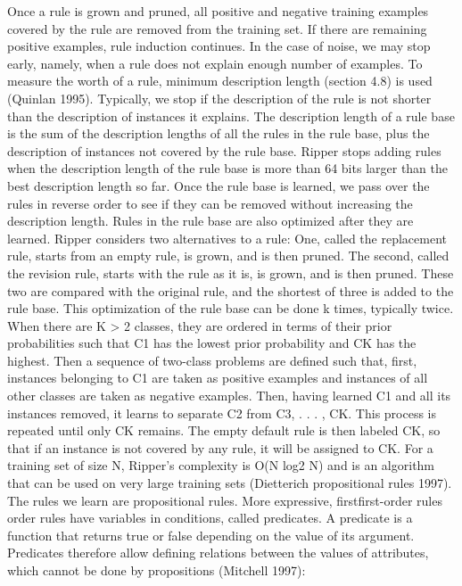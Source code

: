 Once a rule is grown and pruned, all positive and negative training examples covered by the rule are removed from the training set. If there are remaining positive examples, rule induction continues. In the case of noise, we may stop early, namely, when a rule does not explain enough number of examples. To measure the worth of a rule, minimum description length (section 4.8) is used (Quinlan 1995). Typically, we stop if the description of the rule is not shorter than the description of instances it explains. The description length of a rule base is the sum of the description lengths of all the rules in the rule base, plus the description of instances not covered by the rule base. Ripper stops adding rules when the description length of the rule base is more than 64 bits larger than the best description length so far. Once the rule base is learned, we pass over the rules in reverse order to see if they can be removed without increasing the description length. Rules in the rule base are also optimized after they are learned. Ripper considers two alternatives to a rule: One, called the replacement rule, starts from an empty rule, is grown, and is then pruned. The second, called the revision rule, starts with the rule as it is, is grown, and is then pruned. These two are compared with the original rule, and the shortest of three is added to the rule base. This optimization of the rule base can be done k times, typically twice. When there are K > 2 classes, they are ordered in terms of their prior probabilities such that C1 has the lowest prior probability and CK has the highest. Then a sequence of two-class problems are defined such that, first, instances belonging to C1 are taken as positive examples and instances of all other classes are taken as negative examples. Then, having learned C1 and all its instances removed, it learns to separate C2 from C3, . . . , CK. This process is repeated until only CK remains. The empty default rule is then labeled CK, so that if an instance is not covered by any rule, it will be assigned to CK. For a training set of size N, Ripper’s complexity is O(N log2 N) and is an algorithm that can be used on very large training sets (Dietterich propositional rules 1997). The rules we learn are propositional rules. More expressive, firstfirst-order rules order rules have variables in conditions, called predicates. A predicate is a function that returns true or false depending on the value of its argument. Predicates therefore allow defining relations between the values of attributes, which cannot be done by propositions (Mitchell 1997):

